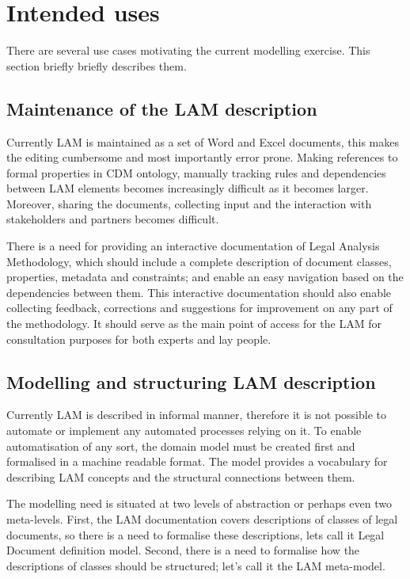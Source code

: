 
\section{Intended uses}\label{ariaid-title1}

There are several use cases motivating the current modelling exercise.
This section briefly briefly describes them.

\subsection{Maintenance of the LAM
description}\label{maintenance-of-the-lam-description}

Currently LAM is maintained as a set of Word and Excel documents, this
makes the editing cumbersome and most importantly error prone. Making
references to formal properties in CDM ontology, manually tracking rules
and dependencies between LAM elements becomes increasingly difficult as
it becomes larger. Moreover, sharing the documents, collecting input and
the interaction with stakeholders and partners becomes difficult.

There is a need for providing an interactive documentation of Legal
Analysis Methodology, which should include a complete description of
document classes, properties, metadata and constraints; and enable an
easy navigation based on the dependencies between them. This interactive
documentation should also enable collecting feedback, corrections and
suggestions for improvement on any part of the methodology. It should
serve as the main point of access for the LAM for consultation purposes
for both experts and lay people.

\subsection{Modelling and structuring LAM
description}\label{modelling-and-structuring-lam-description}

Currently LAM is described in informal manner, therefore it is not
possible to automate or implement any automated processes relying on it.
To enable automatisation of any sort, the domain model must be created
first and formalised in a machine readable format. The model provides a
vocabulary for describing LAM concepts and the structural connections
between them.

The modelling need is situated at two levels of abstraction or perhaps
even two meta-levels. First, the LAM documentation covers descriptions
of classes of legal documents, so there is a need to formalise these
descriptions, lets call it Legal Document definition model. Second,
there is a need to formalise how the descriptions of classes should be
structured; let's call it the LAM meta-model.

